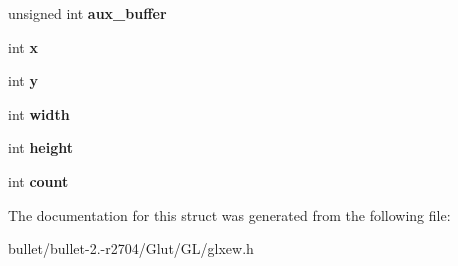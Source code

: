 \begin{DoxyCompactItemize}
\item 
\hypertarget{struct_g_l_x_pbuffer_clobber_event_a13193b6e7e3e52b15f754fe91403b7ec}{unsigned int {\bfseries aux\+\_\+buffer}}\label{struct_g_l_x_pbuffer_clobber_event_a13193b6e7e3e52b15f754fe91403b7ec}

\item 
\hypertarget{struct_g_l_x_pbuffer_clobber_event_a8f0a7162a033c89ee94ce535580dbc32}{int {\bfseries x}}\label{struct_g_l_x_pbuffer_clobber_event_a8f0a7162a033c89ee94ce535580dbc32}

\item 
\hypertarget{struct_g_l_x_pbuffer_clobber_event_a69eb7ac60d36ac3ec4550ac206cfc61f}{int {\bfseries y}}\label{struct_g_l_x_pbuffer_clobber_event_a69eb7ac60d36ac3ec4550ac206cfc61f}

\item 
\hypertarget{struct_g_l_x_pbuffer_clobber_event_aaca375fecb872c73c60cd5d0bfc7c7a5}{int {\bfseries width}}\label{struct_g_l_x_pbuffer_clobber_event_aaca375fecb872c73c60cd5d0bfc7c7a5}

\item 
\hypertarget{struct_g_l_x_pbuffer_clobber_event_aed4e539c896bdad15217bf92c28f8520}{int {\bfseries height}}\label{struct_g_l_x_pbuffer_clobber_event_aed4e539c896bdad15217bf92c28f8520}

\item 
\hypertarget{struct_g_l_x_pbuffer_clobber_event_a61e9f6b31738464dca67f909fcacd298}{int {\bfseries count}}\label{struct_g_l_x_pbuffer_clobber_event_a61e9f6b31738464dca67f909fcacd298}

\end{DoxyCompactItemize}


The documentation for this struct was generated from the following file\+:\begin{DoxyCompactItemize}
\item 
bullet/bullet-\/2.-\/r2704/\+Glut/\+G\+L/glxew.\+h\end{DoxyCompactItemize}
